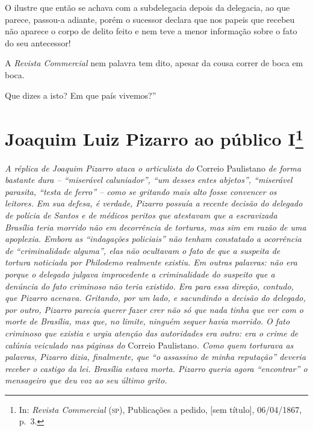 O ilustre que então se achava com a subdelegacia depois da delegacia, ao
que parece, passou-a adiante, porém o sucessor declara que nos papeis
que recebeu não aparece o corpo de delito feito e nem teve a menor
informação sobre o fato do seu antecessor!

A \emph{Revista Commercial} nem palavra tem dito, apesar da cousa correr
de boca em boca.

Que dizes a isto? Em que país vivemos?''

\chapter{Joaquim Luiz Pizarro ao público I\footnote{ In: \emph{Revista Commercial} (\textsc{sp}), Publicações a pedido, {[}sem título{]}, 06/04/1867, p.~3.}}

\begin{didascalia}
\emph{A réplica de Joaquim Pizarro ataca o articulista do} Correio
Paulistano \emph{de forma bastante dura -- ``miserável caluniador'', ``um
desses entes abjetos'', ``miserável parasita, ``testa de ferro'' -- como se
gritando mais alto fosse convencer os leitores. Em sua defesa, é
verdade, Pizarro possuía a recente decisão do delegado de polícia de
Santos e de médicos peritos que atestavam que a escravizada Brasília
teria morrido não em decorrência de torturas, mas sim em razão de uma
apoplexia. Embora as ``indagações policiais'' não tenham constatado a
ocorrência de ``criminalidade alguma'', elas não ocultavam o fato de que a
suspeita de tortura noticiada por Philodemo realmente existiu. Em outras
palavras: não era porque o delegado julgava improcedente a criminalidade
do suspeito que a denúncia do fato criminoso não teria existido. Era
para essa direção, contudo, que Pizarro acenava. Gritando, por um lado,
e sacundindo a decisão do delegado, por outro, Pizarro parecia querer
fazer crer não só que nada tinha que ver com o morte de Brasília, mas
que, no limite, ninguém sequer havia morrido. O fato criminoso que
existia e urgia atenção das autoridades era outro: era o crime de
calúnia veiculado nas páginas do} Correio Paulistano\emph{. Como quem
torturava as palavras, Pizarro dizia, finalmente, que ``o assassino de
minha reputação'' deveria receber o castigo da lei. Brasília estava
morta. Pizarro queria agora ``encontrar'' o mensageiro que deu voz ao seu
último grito.}
\end{didascalia}




